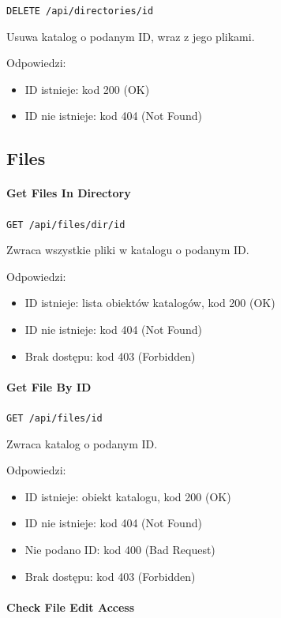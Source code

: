 \documentclass[a4paper,twoside,12pt]{book}
\begin{document}
\texttt{DELETE /api/directories/{id}}

Usuwa katalog o podanym ID, wraz z jego plikami.

Odpowiedzi: 
\begin{itemize}
	\item ID istnieje: kod 200 (OK) 
	\item ID nie istnieje: kod 404 (Not Found)
\end{itemize}

\subsection{Files}

\paragraph{Get Files In Directory}

\texttt{GET /api/files/dir/{id}}

Zwraca wszystkie pliki w katalogu o podanym ID.

Odpowiedzi: 
\begin{itemize}
	\item ID istnieje: lista obiektów katalogów, kod 200 (OK) 
	\item ID nie istnieje: kod 404 (Not Found) 
	\item Brak dostępu: kod 403 (Forbidden)
\end{itemize}

\paragraph{Get File By ID}

\texttt{GET /api/files/{id}}

Zwraca katalog o podanym ID.

Odpowiedzi: 
\begin{itemize}
	\item ID istnieje: obiekt katalogu, kod 200 (OK) 
	\item ID nie istnieje: kod 404 (Not Found) 
	\item Nie podano ID: kod 400 (Bad Request) 
	\item Brak dostępu: kod 403 (Forbidden)
\end{itemize}

\paragraph{Check File Edit Access}
\end{document}
